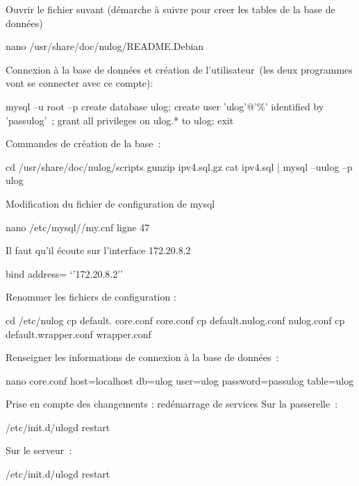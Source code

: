 \documentclass[12pt]{report}
\begin{document}
\begin{itemize}
Ouvrir le fichier suvant (démarche à suivre pour creer les tables de la base de données)
\newline

nano /usr/share/doc/nulog/README.Debian
\newline

Connexion à la base de données et création de l’utilisateur (les deux programmes vont se connecter avec ce compte):
\newline

mysql –u root –p
create database ulog;
create user 'ulog'@'\%' identified by 'passulog' ;
grant all privileges on ulog.* to ulog;
exit
\newline

Commandes de création de la base :
\newline

cd /usr/share/doc/nulog/scripts
gunzip ipv4.sql.gz
cat ipv4.sql | mysql –uulog –p ulog

\newline
Modification du fichier de configuration de mysql
\newline

nano /etc/mysql//my.cnf
ligne 47
\newline

Il faut qu’il écoute sur l’interface 172.20.8.2

bind address= ‘’172.20.8.2’’
\newline

Renommer les fichiers de configuration :
\newline

cd /etc/nulog
cp default. core.conf core.conf
cp default.nulog.conf nulog.conf
cp default.wrapper.conf wrapper.conf
\newline

Renseigner les informations de connexion à la base de données :
\newline

nano core.conf
host=localhost
db=ulog
user=ulog
password=passulog
table=ulog

\newline
Prise en compte des changements : redémarrage de services
Sur la passerelle :
\newline

/etc/init.d/ulogd restart

\newline
Sur le serveur :

\newline
/etc/init.d/ulogd restart



\end{itemize}
\end{document}
